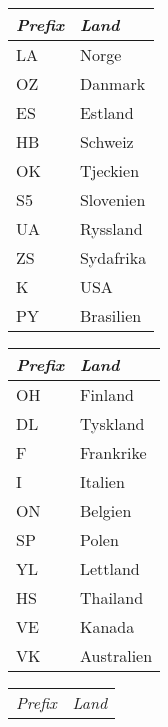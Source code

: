 \begin{table*}[ht]
  \begin{center}
    \begin{minipage}{.3\linewidth}
      \begin{tabular}{ll}
        \emph{Prefix} & \emph{Land} \\
        \hline
        LA            & Norge       \\
        OZ            & Danmark     \\
        ES            & Estland     \\
        HB            & Schweiz     \\
        OK            & Tjeckien    \\
        S5            & Slovenien   \\
        UA            & Ryssland    \\
        ZS            & Sydafrika   \\
        K             & USA         \\
        PY            & Brasilien   \\
      \end{tabular}
    \end{minipage}
    \begin{minipage}{.3\linewidth}
      \begin{tabular}{ll}
        \emph{Prefix} & \emph{Land} \\
        \hline
        OH            & Finland     \\
        DL            & Tyskland    \\
        F             & Frankrike   \\
        I             & Italien     \\
        ON            & Belgien     \\
        SP            & Polen       \\
        YL            & Lettland    \\
        HS            & Thailand    \\
        VE            & Kanada      \\
        VK            & Australien  \\
      \end{tabular}
    \end{minipage}
    \begin{minipage}{.3\linewidth}
      \begin{tabular}{ll}
        \emph{Prefix} & \emph{Land} \\

\end{tabular}
\end{minipage}
\end{center}
\end{table*}
